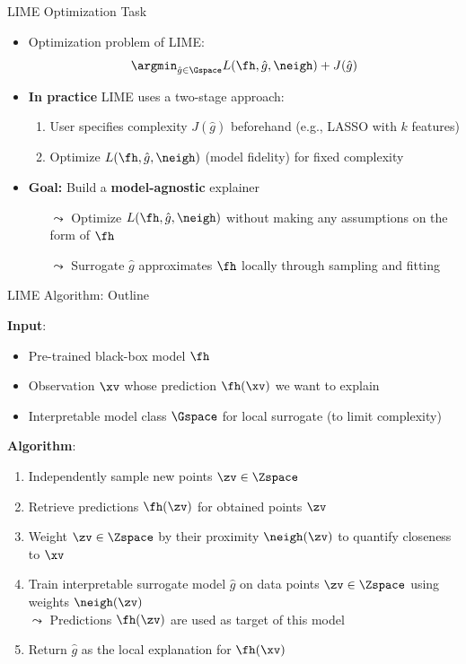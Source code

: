 \documentclass[11pt,compress,t,notes=noshow, aspectratio=169, xcolor=table]{beamer}
\newcommand{\gh}{\hat{g}}
\begin{document}
\begin{frame}{LIME Optimization Task}
	\begin{itemize}
		\item Optimization problem of LIME: 
		$$ \argmin_{\gh \in \Gspace} L(\fh, \gh, \neigh) + J(\gh)$$
		\item \textbf{In practice} LIME uses a two-stage approach:
		\begin{enumerate}
                \item User specifies complexity $J(\gh)$ beforehand (e.g., LASSO with \( k \) features)
		    \item Optimize $L(\fh, \gh, \neigh)$ (model fidelity) for fixed complexity
		\end{enumerate}
		\item \textbf{Goal:} Build a \textbf{model-agnostic} explainer
		\begin{itemize}
    		\item[$\leadsto$] Optimize $L(\fh, \gh, \neigh)$ without making any assumptions on the form of $\fh$ 
    		\item[$\leadsto$] Surrogate \( \gh \) approximates \( \fh \) locally through sampling and fitting
		\end{itemize}
		\end{itemize}
\end{frame} 

\begin{frame}{LIME Algorithm: Outline }
		
		\textbf{Input}:
		\begin{itemize}
		    \item Pre-trained black-box model $\fh$
		    \item Observation $\xv$ whose prediction $\fh(\xv)$ we want to explain
		    \item Interpretable model class $\Gspace$ for local surrogate (to limit complexity)
		\end{itemize}
		
		\pause
		\medskip
		
		\textbf{Algorithm}:
		\begin{enumerate}
    		\item Independently sample new points $\zv \in \Zspace$ 
    		\item Retrieve predictions $\fh(\zv)$ for obtained points $\zv$ 
    		\item Weight $\zv \in \Zspace$ by their proximity $\neigh(\zv)$ to quantify closeness to \( \xv \)
    		\item Train interpretable surrogate model $\gh$ on data points $\zv \in \Zspace$ using weights $\neigh(\zv)$\\ $\leadsto$ Predictions $\fh(\zv)$ are used as target of this model
    		\item Return \( \gh \) as the local explanation for \( \fh(\xv) \)
		\end{enumerate}
		

	
\end{frame} 
\end{document}
